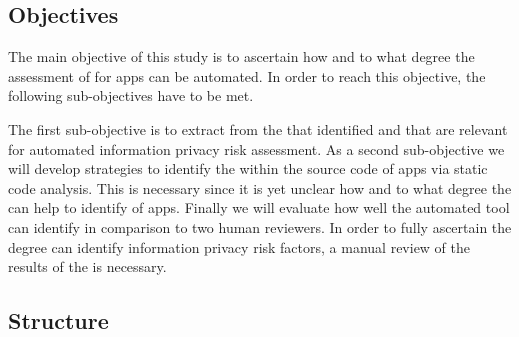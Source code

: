 \subsection{Objectives}

The main objective of this study is to ascertain how and to what degree the assessment of \iprfs for \mH apps can be automated.
In order to reach this objective, the following sub-objectives have to be met.

The first sub-objective is to extract \iprfs from the \ipp that \cite{Dehling2016} identified and that are relevant for automated information privacy risk assessment.
As a second sub-objective we will develop strategies to identify the \iprfs within the source code of \mH apps via static code analysis.
This is necessary since it is yet unclear how and to what degree the \sca can help to identify \iprfs of \mH apps. 
Finally we will evaluate how well the automated \pra tool can identify \iprfs in comparison to two human reviewers.
In order to fully ascertain the degree \sca can identify information privacy risk factors, a manual review of the results of the \sca is necessary.

\subsection{Structure}
